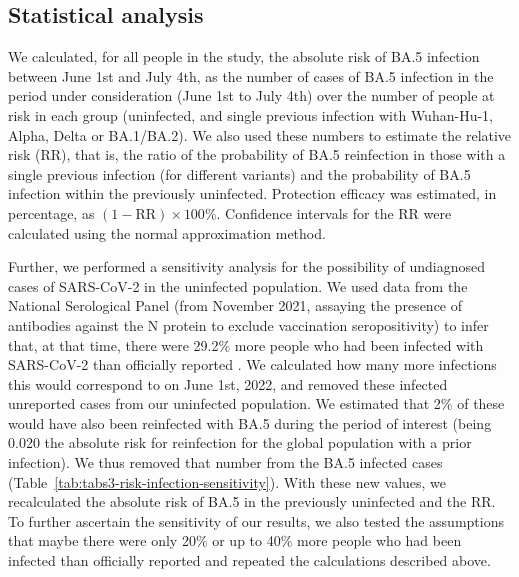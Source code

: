 \subsection{Statistical analysis}

We calculated, for all people in the study, the absolute risk of BA.5 infection between June 1st and July 4th, as the number of cases of BA.5 infection in the period under consideration (June 1st to July 4th) over the number of people at risk in each group (uninfected, and single previous infection with Wuhan-Hu-1, Alpha, Delta or BA.1/BA.2). We also used these numbers to estimate the relative risk (RR), that is, the ratio of the probability of BA.5 reinfection in those with a single previous infection (for different variants) and the probability of BA.5 infection within the previously uninfected. Protection efficacy was estimated, in percentage, as $(1 - \text{RR}) \times 100\%$. Confidence intervals for the RR were calculated using the normal approximation method.

Further, we performed a sensitivity analysis for the possibility of undiagnosed cases of SARS-CoV-2 in the uninfected population. We used data from the National Serological Panel (from November 2021, assaying the presence of antibodies against the N protein to exclude vaccination seropositivity) to infer that, at that time, there were 29.2\% more people who had been infected with SARS-CoV-2 than officially reported \citep{institutonacionaldesaudedoutorricardojorge2021NationalCOVID19}. We calculated how many more infections this would correspond to on June 1st, 2022, and removed these infected unreported cases from our uninfected population. We estimated that 2\% of these would have also been reinfected with BA.5 during the period of interest (being 0.020 the absolute risk for reinfection for the global population with a prior infection). We thus removed that number from the BA.5 infected cases (Table~\ref{tab:tabs3-risk-infection-sensitivity}). With these new values, we recalculated the absolute risk of BA.5 in the previously uninfected and the RR. To further ascertain the sensitivity of our results, we also tested the assumptions that maybe there were only 20\% or up to 40\% more people who had been infected than officially reported and repeated the calculations described above.

